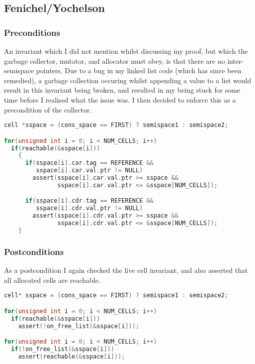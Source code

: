 \subsection{Fenichel/Yochelson}
\label{sec:results-impl-c}

\subsubsection{Preconditions}
\label{sec:results-impl-c-pre}

An invariant which I did not mention whilst discussing my proof, but
which the garbage collector, mutator, and allocator must obey, is that
there are no inter-semispace pointers. Due to a bug in my linked list
code (which has since been remedied), a garbage collection occuring
whilst appending a value to a list would result in this invariant
being broken, and resulted in my being stuck for some time before I
realised what the issue was. I then decided to enforce this as a
precondition of the collector.

\begin{lstlisting}[language=C,caption={Fenichel/Yochelson Preconditions}]
cell *sspace = (cons_space == FIRST) ? semispace1 : semispace2;

for(unsigned int i = 0; i < NUM_CELLS; i++)
  if(reachable(&sspace[i]))
    {
      if(sspace[i].car.tag == REFERENCE &&
         sspace[i].car.val.ptr != NULL)
        assert(sspace[i].car.val.ptr >= sspace &&
               sspace[i].car.val.ptr <= &sspace[NUM_CELLS]);

      if(sspace[i].cdr.tag == REFERENCE &&
         sspace[i].cdr.val.ptr != NULL)
        assert(sspace[i].cdr.val.ptr >= sspace &&
               sspace[i].cdr.val.ptr <= &sspace[NUM_CELLS]);
    }
\end{lstlisting}

\subsubsection{Postconditions}
\label{sec:results-impl-c-post}

As a postcondition I again checked the live cell invariant, and also
asserted that all allocated cells are reachable.

\begin{lstlisting}[language=C,caption={Fenichel/Yochelson Postconditions}]
cell* sspace = (cons_space == FIRST) ? semispace1 : semispace2;

for(unsigned int i = 0; i < NUM_CELLS; i++)
  if(reachable(&sspace[i]))
    assert(!on_free_list(&sspace[i]));

for(unsigned int i = 0; i < NUM_CELLS; i++)
  if(!on_free_list(&sspace[i]))
    assert(reachable(&sspace[i]));
\end{lstlisting}

